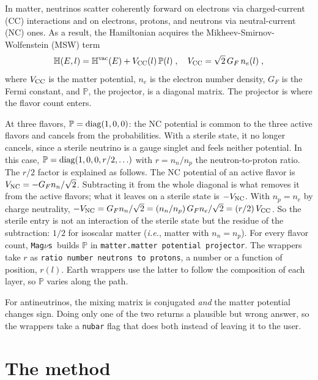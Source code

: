 \documentclass[final,5p,times,twocolumn,sort,compress]{elsarticle}
\makeatletter
\newcommand{\ie}{{\it i.e.}}
\DeclareRobustCommand{\_}{%
  \ifmmode\nfss@text{\textunderscore}\else\textunderscore\allowbreak\fi}
\newcommand{\magnus}{{\tt Mag}\ensuremath{\nu}{\tt s}}
\makeatother
\begin{document}
In matter, neutrinos scatter coherently forward on electrons via charged-current (CC) interactions and on electrons, protons, and neutrons via neutral-current (NC) ones. As a result, the Hamiltonian acquires the Mikheev-Smirnov-Wolfenstein (MSW) term\ \cite{Wolfenstein:1977ue, Mikheev:1986gs}
\begin{equation}
 \label{equ:h_matter}
 \mathbb{H}(E, l)
 =
 \mathbb{H}^{\rm vac}(E)
 +
 V_{\rm CC}(l)\, \mathbb{P}(l) \;,
 \quad
 V_{\rm CC} = \sqrt{2}\, G_F\, n_e(l) \;,
\end{equation}
where $V_{\rm CC}$ is the matter potential, $n_e$ is the electron number density, $G_F$ is the Fermi constant, and $\mathbb{P}$, the projector, is a diagonal matrix. The projector is where the flavor count enters. 

At three flavors, $\mathbb{P} = {\rm diag}(1,0,0)$: the NC potential is common to the three active flavors and cancels from the probabilities. With a sterile state, it no longer cancels, since a sterile neutrino is a gauge singlet and feels neither potential. In this case, $\mathbb{P} = {\rm diag}(1, 0, 0, r/2, \ldots)$ with $r = n_n/n_p$ the neutron-to-proton ratio. The $r/2$ factor is explained as follows. The NC potential of an active flavor is $V_{\rm NC} = -G_F n_n/\sqrt{2}$. Subtracting it from the whole diagonal is what removes it from the active flavors; what it leaves on a sterile state is $-V_{\rm NC}$. With $n_p = n_e$ by charge neutrality, $-V_{\rm NC} = G_F n_n/\sqrt{2} = (n_n/n_p)\,G_F n_e/\sqrt{2} = (r/2)\,V_{\rm CC}$. So the sterile entry is not an interaction of the sterile state but the residue of the subtraction: $1/2$ for isoscalar matter (\ie, matter with $n_n = n_p$). For every flavor count, \magnus\ builds $\mathbb{P}$ in {\tt matter.matter\_potential\_projector}. The wrappers take $r$ as {\tt ratio\_number\_neutrons\_to\_protons}, a number or a function of position, $r(l)$. Earth wrappers use the latter to follow the composition of each layer, so $\mathbb{P}$ varies along the path.

For antineutrinos, the mixing matrix is conjugated \emph{and} the matter potential changes sign. Doing only one of the two returns a plausible but wrong answer, so the wrappers take a {\tt nubar} flag that does both instead of leaving it to the user.


\section{The method}
\label{sec:method}
\end{document}
